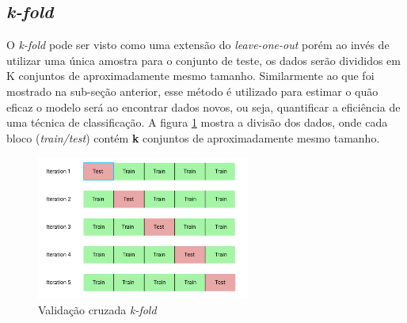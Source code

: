 \documentclass[paper=a4, fontsize=11pt]{scrartcl}
\numberwithin{equation}{section}		%
\numberwithin{figure}{section}			%
\numberwithin{table}{section}				%
\begin{document}
	\subsection{\textit{k-fold}}
	
	O \textit{k-fold} pode ser visto como uma extensão do \textit{leave-one-out} porém ao invés de utilizar uma única amostra para o conjunto de teste, os dados serão divididos em K conjuntos de aproximadamente mesmo tamanho. Similarmente ao que foi mostrado na sub-seção anterior, esse método é utilizado para estimar o quão eficaz o modelo será ao encontrar dados novos, ou seja, quantificar a eficiência de uma técnica de classificação. A figura \ref{fig:kfold} mostra a divisão dos dados, onde cada bloco (\textit{train/test}) contém \textbf{k} conjuntos de aproximadamente mesmo tamanho.
	
	\begin{figure}[h!]
		\includegraphics[width=7cm]{img/k-fold1.png}
		\centering
		\caption{Validação cruzada \textit{k-fold}}
		\label{fig:kfold}
	\end{figure}
	
	
	
	
\end{document}
